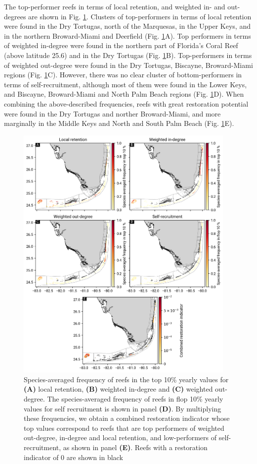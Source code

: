 \documentclass[preprint,12pt,authoryear]{elsarticle}
\begin{document}
The top-performer reefs in terms of local retention, and weighted in- and out-degrees are shown in Fig. \ref{fig:top10}. Clusters of top-performers in terms of local retention were found in the Dry Tortugas, north of the Marquesas, in the Upper Keys, and in the northern Broward-Miami and Deerfield  (Fig. \ref{fig:top10}A). Top performers in terms of weighted in-degree were found in the northern part of Florida's Coral Reef (above latitude 25.6) and in the Dry Tortugas (Fig. \ref{fig:top10}B). Top-performers in terms of weighted out-degree were found in the Dry Tortugas, Biscayne, Broward-Miami regions (Fig. \ref{fig:top10}C). However, there was no clear cluster of bottom-performers in terms of self-recruitment, although most of them were found in the Lower Keys, and Biscayne, Broward-Miami and North Palm Beach regions (Fig. \ref{fig:top10}D). When combining the above-described frequencies, reefs with great restoration potential were found in the Dry Tortugas and norther Broward-Miami, and more marginally in the Middle Keys and North and South Palm Beach (Fig. \ref{fig:top10}E).

\begin{figure}
   \centering
   \includegraphics[width=0.95\textwidth]{figures/fig_top10.png}
   \caption{Species-averaged frequency of reefs in the top 10\% yearly values for \textbf{(A)} local retention, \textbf{(B)} weighted in-degree and \textbf{(C)} weighted out-degree. The species-averaged frequency of reefs in flop 10\% yearly values for self recruitment is shown in panel \textbf{(D)}. By multiplying these frequencies, we obtain a combined restoration indicator whose top values correspond to reefs that are top performers of weighted out-degree, in-degree and local retention, and low-performers of self-recruitment, as shown in panel \textbf{(E)}. Reefs with a restoration indicator of 0 are shown in black}\label{fig:top10}
\end{figure}
\end{document}

